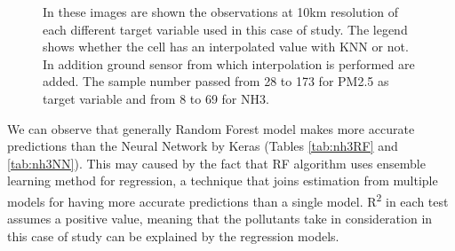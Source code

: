 \begin{figure}[H] 
    \centering
    \hfill%
    \caption{In these images are shown the observations at 10km resolution of each different target variable used in this case of study. The legend shows whether the cell has an interpolated value with KNN or not. In addition ground sensor from which interpolation is performed are added. 
    The sample number passed from 28 to 173 for PM2.5 as target variable and from 8 to 69 for NH3.}
    \label{fig:comparison-sensors}
\end{figure}

We can observe that generally Random Forest model makes more accurate predictions than the Neural Network by Keras (Tables \ref{tab:nh3RF} and \ref{tab:nh3NN}). This may caused by the fact that RF algorithm uses ensemble learning method for regression, a technique that joins estimation from multiple models for having more accurate predictions than a single model. 
R\textsuperscript{2} in each test assumes a positive value, meaning that the pollutants take in consideration in this case of study can be explained by the regression models. 
